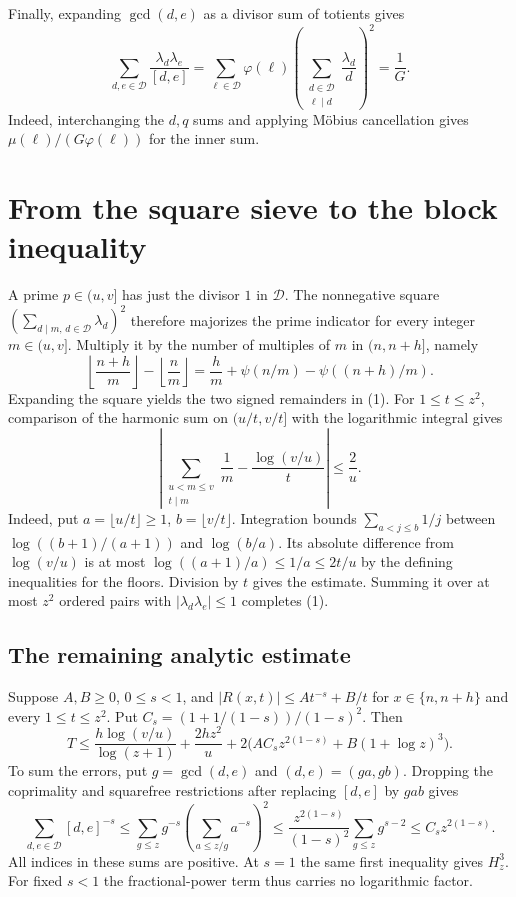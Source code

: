 \documentclass[10pt]{article}
\newcommand{\D}{\mathcal D}
\begin{document}
Finally, expanding $\gcd(d,e)$ as a divisor sum of totients gives
\[
 \sum_{d,e\in\D}\frac{\lambda_d\lambda_e}{[d,e]}
 =\sum_{\ell\in\D}\varphi(\ell)
   \left(\sum_{\substack{d\in\D\\\ell\mid d}}\frac{\lambda_d}{d}\right)^2
 =\frac1G.
\]
Indeed, interchanging the $d,q$ sums and applying M\"obius cancellation gives $\mu(\ell)/(G\varphi(\ell))$ for the inner sum.

\newpage
\section*{From the square sieve to the block inequality}
A prime $p\in(u,v]$ has just the divisor $1$ in $\D$. The nonnegative square $(\sum_{d\mid m,\,d\in\D}\lambda_d)^2$ therefore majorizes the prime indicator for every integer $m\in(u,v]$. Multiply it by the number of multiples of $m$ in $(n,n+h]$, namely
\[
 \left\lfloor\frac{n+h}{m}\right\rfloor-\left\lfloor\frac n m\right\rfloor
 =\frac h m + \psi(n/m)-\psi((n+h)/m).
\]
Expanding the square yields the two signed remainders in (1). For $1\le t\le z^2$, comparison of the harmonic sum on $(u/t,v/t]$ with the logarithmic integral gives
\[
 \left|\sum_{\substack{u<m\le v\\t\mid m}}\frac1m-
             \frac{\log(v/u)}{t}\right|\le\frac2u.
\]
Indeed, put $a=\lfloor u/t\rfloor\ge1$, $b=\lfloor v/t\rfloor$. Integration bounds $\sum_{a<j\le b}1/j$ between $\log((b+1)/(a+1))$ and $\log(b/a)$. Its absolute difference from $\log(v/u)$ is at most $\log((a+1)/a)\le1/a\le2t/u$ by the defining inequalities for the floors. Division by $t$ gives the estimate. Summing it over at most $z^2$ ordered pairs with $|\lambda_d\lambda_e|\le1$ completes (1).

\subsection*{The remaining analytic estimate}
Suppose $A,B\ge0$, $0\le s<1$, and $|R(x,t)|\le A t^{-s}+B/t$ for $x\in\{n,n+h\}$ and every $1\le t\le z^2$. Put $C_s=(1+1/(1-s))/(1-s)^2$. Then
\begin{equation}
 T\le \frac{h\log(v/u)}{\log(z+1)}+\frac{2hz^2}{u}
       +2\bigl(A C_s z^{2(1-s)}+B(1+\log z)^3\bigr).
 \tag{2}
\end{equation}
To sum the errors, put $g=\gcd(d,e)$ and $(d,e)=(ga,gb)$. Dropping the coprimality and squarefree restrictions after replacing $[d,e]$ by $gab$ gives
\[
 \sum_{d,e\in\D}[d,e]^{-s}
 \le \sum_{g\le z}g^{-s}\left(\sum_{a\le z/g}a^{-s}\right)^2
 \le \frac{z^{2(1-s)}}{(1-s)^2}\sum_{g\le z}g^{s-2}
 \le C_s z^{2(1-s)} .
\]
All indices in these sums are positive. At $s=1$ the same first inequality gives $H_z^3$. For fixed $s<1$ the fractional-power term thus carries no logarithmic factor.
\end{document}
